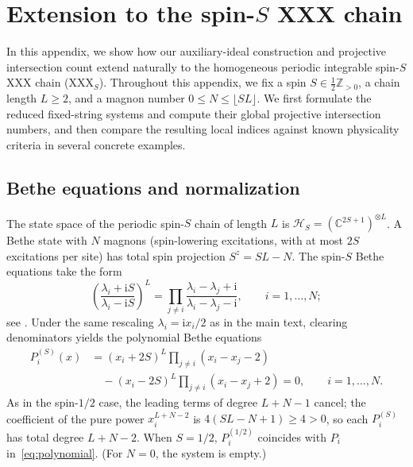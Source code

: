 \documentclass[11pt]{article}
\theoremstyle{definition}
\newcommand{\ii}{\mathrm{i}}
\newcommand{\C}{\mathbb{C}}
\begin{document}
\section{Extension to the spin-\texorpdfstring{$S$}{S} XXX chain}
\label{app:spin-S-extension}

In this appendix, we show how our auxiliary-ideal construction and projective
intersection count extend naturally to the homogeneous periodic integrable
spin-$S$ XXX chain (XXX$_S$). Throughout this appendix, we fix a spin
$S\in\frac{1}{2}\mathbb{Z}_{>0}$, a chain length $L\ge 2$, and a magnon number
$0\le N\le\lfloor SL\rfloor$. We first formulate the reduced fixed-string systems and compute
their global projective intersection numbers, and then compare the resulting local indices
against known physicality criteria in several concrete examples.

\subsection{Bethe equations and normalization}

The state space of the periodic spin-$S$ chain of length $L$ is $\mathcal{H}_S=(\C^{2S+1})^{\otimes L}$.
A Bethe state with $N$ magnons (spin-lowering excitations, with at most $2S$ excitations per site) has total spin projection $S^z=SL-N$. The spin-$S$ Bethe equations take the form
\begin{equation}\label{eq:spin-S-bethe}
 \left(\frac{\lambda_i+\ii S}{\lambda_i-\ii S}\right)^L
 =\prod_{j\ne i}\frac{\lambda_i-\lambda_j+\ii}
                         {\lambda_i-\lambda_j-\ii},
 \qquad i=1,\ldots,N;
\end{equation}
see \cite{HNS2014,HJJ2024}. Under the same rescaling
$\lambda_i=\ii x_i/2$ as in the main text, clearing denominators yields the polynomial Bethe equations
\begin{equation}\label{eq:spin-S-polynomial}
 \begin{aligned}
 P_i^{(S)}(x)
 &=(x_i+2S)^L\prod_{j\ne i}(x_i-x_j-2)\\
 &\quad{}-(x_i-2S)^L\prod_{j\ne i}(x_i-x_j+2)=0,\qquad i=1,\ldots,N.
 \end{aligned}
\end{equation}
As in the spin-$1/2$ case, the leading terms of degree $L+N-1$ cancel; the coefficient of the pure power
$x_i^{L+N-2}$ is $4(SL-N+1)\ge 4>0$, so each $P_i^{(S)}$ has total degree
$L+N-2$. When $S=1/2$, $P_i^{(1/2)}$ coincides with $P_i$ in~\eqref{eq:polynomial}. (For $N=0$, the system is empty.)
\end{document}
